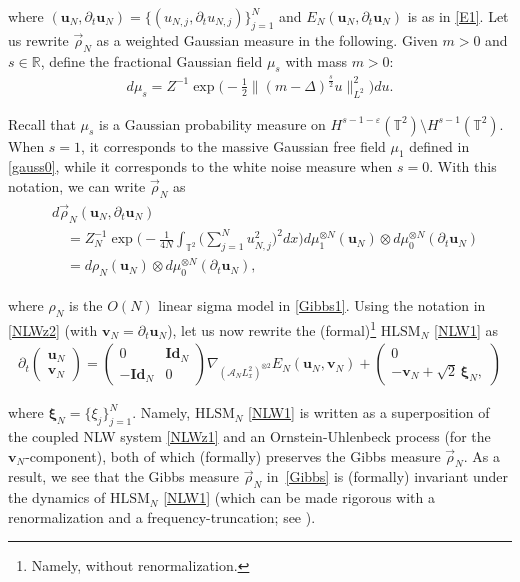 \documentclass[letterpaper, 11pt,  reqno]{amsart}
\newcommand{\1}{\hspace{0.5mm}\text{I}\hspace{0.2mm}}
\newcommand{\noi}{\noindent}
\newcommand{\R}{\mathbb{R}}
\newcommand{\T}{\mathbb{T}}
\newcommand{\Id}{\textbf{Id}}
\newcommand{\eps}{\varepsilon}
\newcommand{\Dl}{\Delta}
\newcommand{\dt}{\partial_t}
\newcommand{\nb}{\nabla}
\newcommand{\A}{\mathcal{A}}
\newcommand{\rhoo}{\vec \rho_N}
\newcommand{\HLS}{$\text{HLSM}_N$ }
\newcommand{\vv}{\mathbf{v}}
\newcommand{\uu}{\mathbf{u}}
\numberwithin{equation}{section}
\numberwithin{theorem}{section}
\begin{document}
\noi
where
$(\uu_N, \dt \uu_N)
= \{(u_{N, j}, \dt u_{N, j})\}_{j = 1}^N$
and 
$E_N (\uu_N, \dt \uu_N) $ is as in \eqref{E1}.
Let us rewrite $\rhoo$ as a weighted Gaussian measure in the following.
Given $m > 0$ and $s \in \R$, 
define the fractional 
Gaussian field  $\mu_s$ with mass $m > 0$:
\begin{align}
    d \mu_{s} = Z^{-1} \exp\bigg(-\frac 12  \| (m - \Dl)^\frac s2 u \|_{L^2}^2 \bigg) du.
\label{gauss1}
\end{align}

\noi
Recall that $\mu_s$ is a Gaussian probability measure
on $H^{s - 1-\eps}(\T^2) \setminus H^{s - 1}(\T^2)$.
When $s = 1$, 
it corresponds to the massive Gaussian free field $\mu_1$
defined in \eqref{gauss0}, 
while it corresponds to the white noise measure when $s = 0$.
With this notation, 
we can write $\rhoo$ as 
\begin{align}
\begin{split}
& d \rhoo 
(\uu_N, \dt \uu_N) \\
& \quad = Z_N^{-1} \exp \bigg( - \frac{1}{4N} \int_{\T^2} 
\Big( \sum_{j = 1}^N u_{N, j}^2 \Big)^2 dx \bigg) 
d \mu_1^{\otimes N} 
    (\uu_N) 
\otimes d  \mu_0^{\otimes N} (\dt \uu_N) \\
& \quad = 
d \rho_N
    (\uu_N) 
\otimes d  \mu_0^{\otimes N} (\dt \uu_N), 
\end{split}
\label{Gibbs}
\end{align}


\noi
where
$\rho_N$
is the 
$O(N)$ linear sigma model in \eqref{Gibbs1}.
Using the notation in \eqref{NLWz2}
(with $\vv_N = \dt \uu_N$), 
let us now rewrite 
the (formal)\footnote{Namely, without renormalization.}   \HLS \eqref{NLW1}
as 
\begin{align*}
\dt \begin{pmatrix}
\uu_N  \\ \vv_N
\end{pmatrix}
= \begin{pmatrix}
0 & \Id_N\\
- \Id_N & 0
\end{pmatrix}
\nb_{(\A_N L^2_x)^{\otimes 2}} E_N(\uu_N, \vv_N) 
    + \begin{pmatrix}
        0 \\ - \vv_N + \sqrt{2}\, \pmb\xi_N, 
    \end{pmatrix}
\end{align*}
 
 

\noi
where $\pmb \xi_N = \{\xi_j\}_{j = 1}^N$.
Namely, 
\HLS \eqref{NLW1}
is written as a superposition
of the coupled NLW system \eqref{NLWz1}
and 
an Ornstein-Uhlenbeck process (for the $\vv_N$-component), 
both of which (formally) preserves 
the Gibbs measure $\rhoo$.
As a result, we see that 
the Gibbs measure $\rhoo$
in~\eqref{Gibbs}
is (formally) invariant under the dynamics of 
\HLS \eqref{NLW1}
(which can be made rigorous with a renormalization
and a frequency-truncation; see \cite[Section 4]{GKOT}).
\end{document}
